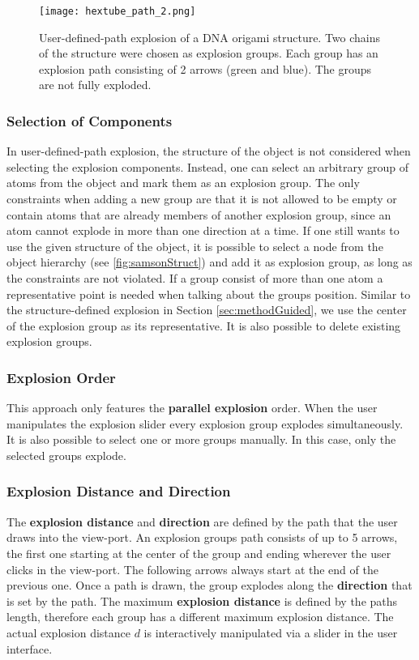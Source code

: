 \documentclass[draft,final]{vutinfth} %
\begin{document}
\begin{figure}
\centering
\texttt{[image: hextube\_path\_2.png]}
\caption{User-defined-path explosion of a DNA origami structure. Two chains of the structure were chosen as explosion groups. Each group has an explosion path consisting of 2 arrows (green and blue). The groups are not fully exploded.}
\label{fig:pathExample}
\end{figure}

\subsubsection{Selection of Components}
\label{subsubsec:explcompsPath} 
In user-defined-path explosion, the structure of the object is not considered when selecting the explosion components.
Instead, one can select an arbitrary group of atoms from the object and mark them as an explosion group.
The only constraints when adding a new group are that it is not allowed to be empty or contain atoms that are already members of another explosion group, since an atom cannot explode in more than one direction at a time.
If one still wants to use the given structure of the object, it is possible to select a node from the object hierarchy (see \autoref{fig:samsonStruct}) and add it as explosion group, as long as the constraints are not violated.
If a group consist of more than one atom a representative point is needed when talking about the groups position. Similar to the structure-defined explosion in Section \ref{sec:methodGuided}, we use the center of the explosion group as its representative.
It is also possible to delete existing explosion groups.

\subsubsection{Explosion Order}
\label{subsubsec:explOrderPath}
This approach only features the \textbf{parallel explosion} order. When the user manipulates the explosion slider every explosion group explodes simultaneously. It is also possible to select one or more groups manually. In this case, only the selected groups explode.

\subsubsection{Explosion Distance and Direction}
\label{subsubsec:expldistdirPath}
The \textbf{explosion distance} and \textbf{direction} are defined by the path that the user draws into the view-port. 
An explosion groups path consists of up to 5 arrows, the first one starting at the center of the group and ending wherever the user clicks in the view-port. 
The following arrows always start at the end of the previous one. 
Once a path is drawn, the group explodes along the \textbf{direction} that is set by the path.
The maximum \textbf{explosion distance} is defined by the paths length, therefore each group has a different maximum explosion distance. The actual explosion distance $d$ is interactively manipulated via a slider in the user interface.
\end{document}

